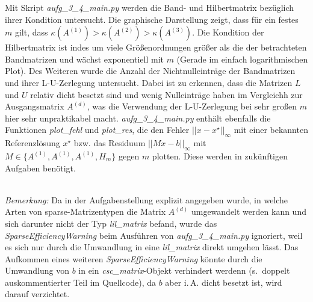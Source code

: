 \documentclass[letterpaper,10pt,ngerman, oneside, openright]{sphinxmanual}
\begin{document}
Mit Skript \textit{aufg\_3\_4\_main.py} werden die Band- und Hilbertmatrix bezüglich ihrer Kondition untersucht. Die graphische Darstellung zeigt, dass für ein festes $m$ gilt, dass $\kappa(A^{(1)})>\kappa(A^{(2)})>\kappa(A^{(3)})$. Die Kondition der Hilbertmatrix ist indes um viele Größenordnungen größer als die der betrachteten Bandmatrizen und wächst exponentiell mit $m$ (Gerade im einfach logarithmischen Plot). Des Weiteren wurde die Anzahl der Nichtnulleinträge der Bandmatrizen und ihrer L-U-Zerlegung untersucht. Dabei ist zu erkennen, dass die Matrizen $L$ und $U$ relativ dicht besetzt sind und wenig Nulleinträge haben im Vergleichh zur Ausgangsmatrix $A^{(d)}$, was die Verwendung der L-U-Zerlegung bei sehr großen $m$ hier sehr unpraktikabel macht. \textit{aufg\_3\_4\_main.py}  enthält ebenfalls die Funktionen \textit{plot\_fehl} und \textit{plot\_res}, die den Fehler $|\lvert x-x^\star|\rvert_\infty$ mit einer bekannten Referenzlösung $x^\star$ bzw. das Residuum $|\lvert Mx-b|\rvert_\infty$ mit $M\in \{A^{(1)},A^{(1)},A^{(1)}, H_m\}$ gegen $m$ plotten. Diese werden in zukünftigen Aufgaben benötigt.

~\\
\emph{Bemerkung:} Da in der Aufgabenstellung explizit angegeben wurde, in welche Arten von sparse-Matrizentypen die Matrix $A^{(d)}$ umgewandelt werden kann und sich darunter nicht der Typ \textit{lil\_matrix} befand, wurde das \textit{SparseEfficiencyWarning} beim Ausführen von \textit{aufg\_3\_4\_main.py} ignoriert, weil es sich nur durch die Umwandlung in eine \textit{lil\_matrix} direkt umgehen lässt. Das Aufkommen eines weiteren \textit{SparseEfficiencyWarning} könnte durch die Umwandlung von $b$ in ein \textit{csc\_matrix}-Objekt verhindert werdenn (s.~doppelt auskommentierter Teil im Quellcode), da $b$ aber i.\,A. dicht besetzt ist, wird darauf verzichtet.



\end{document}
